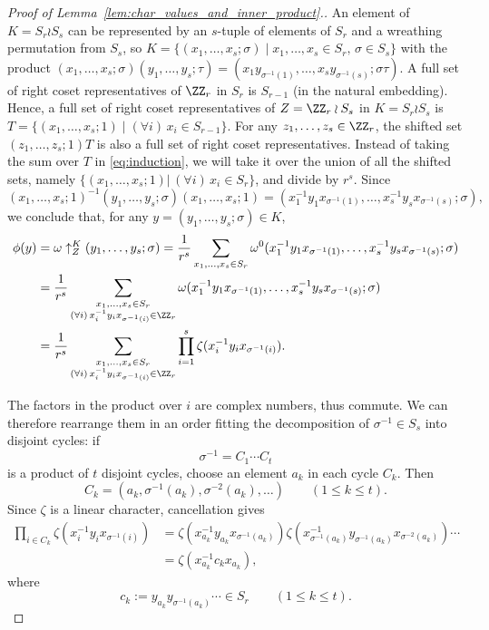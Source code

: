 \begin{proof}[Proof of  Lemma~\ref{lem:char_values_and_inner_product}.]
    An element of $K=S_r\wr S_s$ can be represented by an $s$-tuple of elements of $S_r$ and a wreathing permutation from $S_s$, so
    $K=\{(x_1,\ldots,x_s;\sigma) \mid x_1,\ldots,x_s \in S_{r},\,\sigma\in S_s\}$
    with the product
    $(x_1,\ldots,x_s;\sigma)(y_1,\ldots,y_s;\tau) = (x_1y_{\sigma^{-1}(1)},\ldots,x_sy_{\sigma^{-1}(s)};\sigma\tau)$. 
    A full set of right coset representatives of $\ZZ_r$ in $S_r$ is $S_{r-1}$ (in the natural embedding).
    Hence, a full set of right coset representatives of 
    $Z = \ZZ_r \wr S_s$ in $K= S_r \wr S_s$ is 
    $T = \{(x_1,\ldots,x_s;1)\mid (\forall i)\, x_i \in S_{r-1}\}$. For any $z_1,\ldots,z_s\in \ZZ_r$, the shifted set $(z_1,\ldots,z_s;1)T$ is also a full set of right coset representatives. 
    Instead of taking the sum over $T$ in \eqref{eq:induction}, we will take it over the union of all the shifted sets, namely $\{(x_1,\ldots,x_s;1) \vert\, (\forall i)\, x_i \in S_r\}$, and divide by $r^s$. 
    Since
    \[
        (x_1,\ldots,x_s;1)^{-1} (y_1,\ldots,y_s;\sigma) (x_1,\ldots,x_s;1)
        = (x_1^{-1}y_1x_{\sigma^{-1}(1)},\ldots,x_s^{-1}y_sx_{\sigma^{-1}(s)};\sigma),
    \]
    we conclude that, 
    for any $y = (y_1,\ldots,y_s;\sigma) \in K$,
    \begin{align*}
        \phi(y) 
        &= \omega\uparrow_Z^K(y_1,\ldots,y_s;\sigma)
        = \frac{1}{r^s} \sum_{x_1,\ldots,x_s \in S_r} \omega^0(x_1^{-1}y_1x_{\sigma^{-1}(1)},\ldots,x_s^{-1}y_sx_{\sigma^{-1}(s)};\sigma) \\ 
        &= \frac{1}{r^s} \sum_{\substack{x_1,\ldots,x_s \in S_r \\ (\forall i)\, x_i^{-1}y_ix_{\sigma^{-1}(i)} \in \ZZ_r}} \omega(x_1^{-1}y_1x_{\sigma^{-1}(1)},\ldots,x_s^{-1}y_sx_{\sigma^{-1}(s)};\sigma) \\
        &= \frac{1}{r^s} \sum_{\substack{x_1,\ldots,x_s \in S_r \\ (\forall i)\, x_i^{-1}y_ix_{\sigma^{-1}(i)} \in \ZZ_r}} \prod_{i=1}^{s} \zeta(x_i^{-1}y_ix_{\sigma^{-1}(i)}).
    \end{align*}

    The factors in the product over $i$ are complex numbers, thus commute. We can therefore rearrange them in an order fitting the decomposition of $\sigma^{-1} \in S_s$ into disjoint cycles: if
    \[
        \sigma^{-1} = C_1 \cdots C_t
    \]
    is a product of $t$ disjoint cycles, choose an element $a_k$ in each cycle $C_k$. Then
    \[
        C_k = (a_k, \sigma^{-1}(a_k), \sigma^{-2}(a_k), \ldots)
        \qquad (1 \le k \le t).
    \]
    Since $\zeta$ is a linear character, cancellation gives
    \begin{align*}
        \prod_{i \in C_k} \zeta(x_i^{-1}y_ix_{\sigma^{-1}(i)})
        &= \zeta(x_{a_k}^{-1}y_{a_k}x_{\sigma^{-1}({a_k})})
        \zeta(x_{\sigma^{-1}({a_k})}^{-1}y_{\sigma^{-1}({a_k})}x_{\sigma^{-2}(a_k)})
        \cdots \\
        &= \zeta(x_{a_k}^{-1}c_kx_{a_k}),
    \end{align*}
    where
    \[
        c_k := y_{a_k} y_{\sigma^{-1}({a_k})} \cdots \in S_r
        \qquad (1 \le k \le t).
    \]
		

\end{proof}
